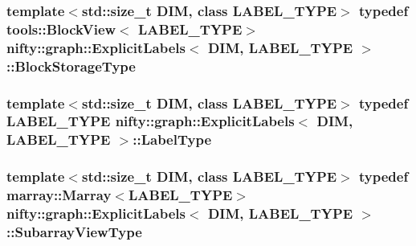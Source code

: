 \subsubsection[{Block\+Storage\+Type}]{\setlength{\rightskip}{0pt plus 5cm}template$<$std\+::size\+\_\+t D\+I\+M, class L\+A\+B\+E\+L\+\_\+\+T\+Y\+P\+E$>$ typedef {\bf tools\+::\+Block\+View}$<$ L\+A\+B\+E\+L\+\_\+\+T\+Y\+P\+E$>$ {\bf nifty\+::graph\+::\+Explicit\+Labels}$<$ D\+I\+M, L\+A\+B\+E\+L\+\_\+\+T\+Y\+P\+E $>$\+::{\bf Block\+Storage\+Type}}\label{classnifty_1_1graph_1_1ExplicitLabels_a896653b58048ec52d8e00800279d9b53}
\hypertarget{classnifty_1_1graph_1_1ExplicitLabels_a3defd2851b5e7071f23a0fdea7aafff0}{}
\subsubsection[{Label\+Type}]{\setlength{\rightskip}{0pt plus 5cm}template$<$std\+::size\+\_\+t D\+I\+M, class L\+A\+B\+E\+L\+\_\+\+T\+Y\+P\+E$>$ typedef L\+A\+B\+E\+L\+\_\+\+T\+Y\+P\+E {\bf nifty\+::graph\+::\+Explicit\+Labels}$<$ D\+I\+M, L\+A\+B\+E\+L\+\_\+\+T\+Y\+P\+E $>$\+::{\bf Label\+Type}}\label{classnifty_1_1graph_1_1ExplicitLabels_a3defd2851b5e7071f23a0fdea7aafff0}
\hypertarget{classnifty_1_1graph_1_1ExplicitLabels_ae07fe2aed8059beb43b043e8a3becdb7}{}
\subsubsection[{Subarray\+View\+Type}]{\setlength{\rightskip}{0pt plus 5cm}template$<$std\+::size\+\_\+t D\+I\+M, class L\+A\+B\+E\+L\+\_\+\+T\+Y\+P\+E$>$ typedef {\bf marray\+::\+Marray}$<$L\+A\+B\+E\+L\+\_\+\+T\+Y\+P\+E$>$ {\bf nifty\+::graph\+::\+Explicit\+Labels}$<$ D\+I\+M, L\+A\+B\+E\+L\+\_\+\+T\+Y\+P\+E $>$\+::{\bf Subarray\+View\+Type}}\label{classnifty_1_1graph_1_1ExplicitLabels_ae07fe2aed8059beb43b043e8a3becdb7}
\hypertarget{classnifty_1_1graph_1_1ExplicitLabels_aaab98314403b95503bf0c32e65fd1884}{}
